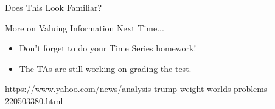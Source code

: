 \documentclass{beamer}\usepackage[]{graphicx}\usepackage[]{color}
\begin{document}
\begin{darkframes}
    \begin{frame}[fragile]{Does This Look Familiar?}
    \fontsize{10}{10}\selectfont  
  

    \end{frame}


    \begin{frame}{More on Valuing Information Next Time...}
      \fontsize{10}{10}\selectfont

      \begin{itemize}
        \item Don't forget to do your Time Series homework!
        \item The TAs are still working on grading the test.
      \end{itemize}https://www.yahoo.com/news/analysis-trump-weight-worlds-problems-220503380.html
      
    \end{frame}

  \end{darkframes}
\end{document}
